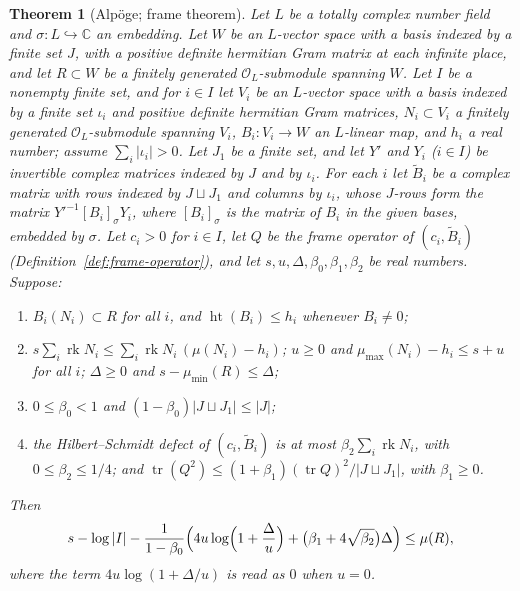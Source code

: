 \documentclass[11pt]{amsbook}
\theoremstyle{plain}
\newtheorem{theorem}{Theorem}[section]
\theoremstyle{definition}
\theoremstyle{remark}
\numberwithin{equation}{section}
\numberwithin{figure}{chapter}
\numberwithin{table}{chapter}
\renewcommand{\C}{\mathbb{C}}
\newcommand{\rk}{\operatorname{rk}}
\begin{document}
\begin{theorem}[Alp\"oge; frame theorem]\label{thm:frame}
Let $L$ be a totally complex number field and $\sigma\colon
L\hookrightarrow\C$ an embedding. Let $W$ be an $L$-vector space with a basis
indexed by a finite
set $J$, with a positive definite hermitian Gram matrix at each
infinite place, and let $R\subset W$ be a finitely generated
$\mathcal O_L$-submodule spanning $W$. Let $I$ be a nonempty finite
set, and for $i\in I$ let $V_i$ be an $L$-vector space with a basis
indexed by a finite set $\iota_i$ and positive definite hermitian
Gram matrices, $N_i\subset V_i$ a finitely generated $\mathcal
O_L$-submodule spanning $V_i$, $B_i\colon V_i\to W$ an $L$-linear map,
and $h_i$ a real number; assume $\sum_i|\iota_i|>0$. Let $J_1$ be a
finite set, and let $Y'$ and $Y_i$ ($i\in I$) be invertible complex
matrices indexed by $J$ and by $\iota_i$. For each $i$ let
$\widetilde B_i$ be a complex matrix with rows indexed by $J\sqcup J_1$
and columns by $\iota_i$, whose $J$-rows form the matrix
$Y'^{-1}[B_i]_\sigma Y_i$, where $[B_i]_\sigma$ is the matrix of $B_i$
in the given bases, embedded by $\sigma$. Let $c_i>0$ for $i\in I$, let $Q$ be
the frame operator of $(c_i,\widetilde B_i)$
(Definition~\ref{def:frame-operator}), and let $s,u,\Delta,\beta_0,
\beta_1,\beta_2$ be real numbers. Suppose:
\begin{enumerate}[label=(\alph*)]
\item $B_i(N_i)\subset R$ for all $i$, and $\operatorname{ht}(B_i)\le
h_i$ whenever $B_i\ne0$;
\item $s\sum_i\rk N_i\le\sum_i\rk N_i\,(\mu(N_i)-h_i)$; $u\ge0$ and
$\mu_{\max}(N_i)-h_i\le s+u$ for all $i$; $\Delta\ge0$ and
$s-\mu_{\min}(R)\le\Delta$;
\item $0\le\beta_0<1$ and $(1-\beta_0)|J\sqcup J_1|\le|J|$;
\item the Hilbert--Schmidt defect of $(c_i,\widetilde B_i)$ is at most
$\beta_2\sum_i\rk N_i$, with $0\le\beta_2\le1/4$; and
$\operatorname{tr}(Q^2)\le(1+\beta_1)(\operatorname{tr}Q)^2/
|J\sqcup J_1|$, with $\beta_1\ge0$.
\end{enumerate}
Then
\[
s-\log|I|-\frac{1}{1-\beta_0}\Bigl(4u\log\Bigl(1+\frac{\Delta}{u}
\Bigr)+\bigl(\beta_1+4\sqrt{\beta_2}\bigr)\Delta\Bigr)\le\mu(R),
\]
where the term $4u\log(1+\Delta/u)$ is read as $0$ when $u=0$.
\end{theorem}
\end{document}
